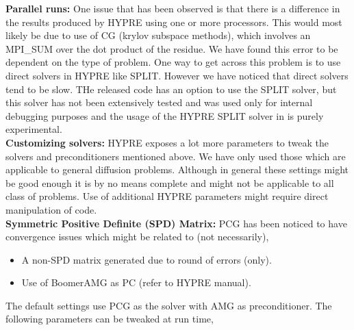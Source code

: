 {\bf Parallel runs:} One issue that has been observed is that there is a difference in the results produced by HYPRE using one or 
more processors. This would most likely be due to use of CG (krylov subspace methods), which involves an MPI\_SUM over the 
dot product of the residue. We have found this error to be dependent on the type of problem. One way to get across this problem is to use 
direct solvers in HYPRE like SPLIT. However we have noticed that direct solvers tend to be slow. THe released code has
an option to use the SPLIT solver, but this solver has not been extensively tested and was used only for internal debugging 
purposes and the usage of the HYPRE SPLIT solver in \flashx is purely experimental. \\ 

{\bf Customizing solvers:} HYPRE exposes a lot more parameters to tweak the solvers and preconditioners mentioned above. We have only used those 
which are applicable to general diffusion problems. Although in general these settings might be good enough it is by no means complete and 
might not be applicable to all class of  problems. Use of additional HYPRE parameters might require direct manipulation of \flashx code. \\

{\bf Symmetric Positive Definite (SPD) Matrix:}
PCG has been noticed to have convergence issues which might be related to (not necessarily),
\begin{itemize}
\item {A non-SPD matrix generated due to round of errors (only).} \\
\item {Use of BoomerAMG as PC (refer to HYPRE manual).} \\
\end{itemize}

The default settings use PCG as the solver with AMG as preconditioner. The following parameters 
can be tweaked at run time, \\

